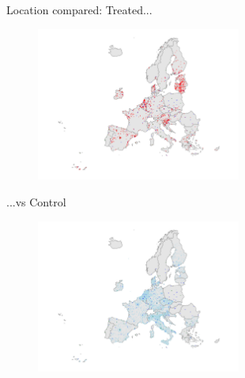 \documentclass{beamer}
\begin{document}
\begin{frame}{Location compared: Treated...}
    \begin{figure}
        \centering
        \includegraphics[width=0.6\textwidth, trim={175 50 50 20}, clip]{../Output/EU_map_onlytreated.pdf}
    \end{figure}
\end{frame}

\begin{frame}{...vs Control}
    \begin{figure}
        \centering
        \includegraphics[width=0.6\textwidth, trim={175 50 50 20}, clip]{../Output/EU_map_onlysample.pdf}
    \end{figure}
\end{frame}
\end{document}
